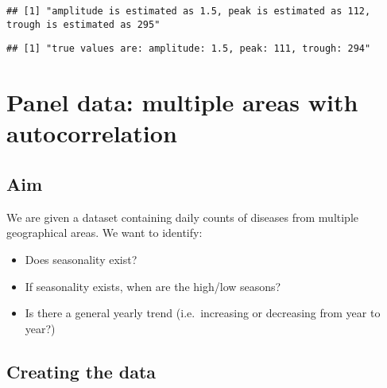 \documentclass[]{book}
\newenvironment{Shaded}{\begin{snugshade}}{\end{snugshade}}
\newcommand{\KeywordTok}[1]{\textcolor[rgb]{0.13,0.29,0.53}{\textbf{#1}}}
\newcommand{\DecValTok}[1]{\textcolor[rgb]{0.00,0.00,0.81}{#1}}
\newcommand{\StringTok}[1]{\textcolor[rgb]{0.31,0.60,0.02}{#1}}
\newcommand{\OperatorTok}[1]{\textcolor[rgb]{0.81,0.36,0.00}{\textbf{#1}}}
\newcommand{\NormalTok}[1]{#1}
\providecommand{\tightlist}{%
  \setlength{\itemsep}{0pt}\setlength{\parskip}{0pt}}
\begin{document}
\begin{verbatim}
## [1] "amplitude is estimated as 1.5, peak is estimated as 112, trough is estimated as 295"
\end{verbatim}

\begin{Shaded}
\end{Shaded}

\begin{verbatim}
## [1] "true values are: amplitude: 1.5, peak: 111, trough: 294"
\end{verbatim}

\chapter{Panel data: multiple areas with
autocorrelation}\label{panel-data-multiple-areas-with-autocorrelation}

\section{Aim}\label{aim-4}

We are given a dataset containing daily counts of diseases from multiple
geographical areas. We want to identify:

\begin{itemize}
\tightlist
\item
  Does seasonality exist?
\item
  If seasonality exists, when are the high/low seasons?
\item
  Is there a general yearly trend (i.e.~increasing or decreasing from
  year to year?)
\end{itemize}

\newpage

\section{Creating the data}\label{creating-the-data-4}
\end{document}
